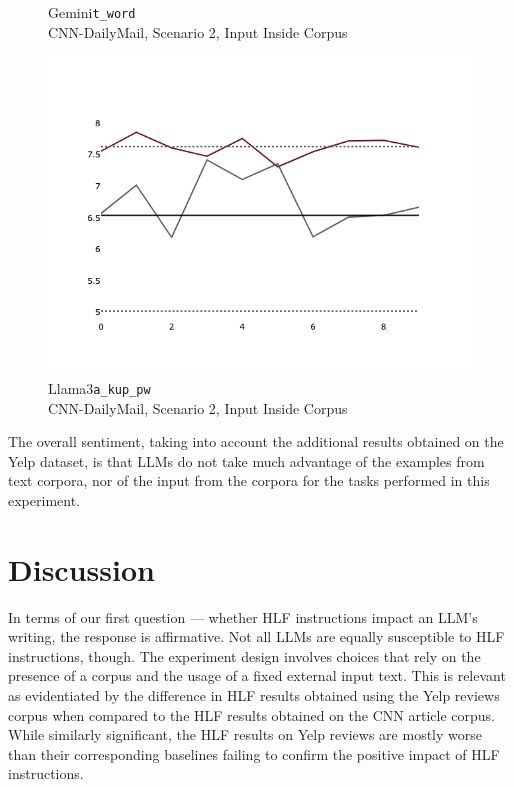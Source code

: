 \documentclass[a4paper,twoside]{article}
\begin{document}
\begin{figure}[ht!]
\begin{minipage}{0.32\textwidth}
        \caption{Gemini\texttt{t\_word}\\CNN-DailyMail, Scenario 2, Input Inside Corpus}\label{fig-p2-ifd-gemini-twords}
    \end{minipage}
    \hfill
    \begin{minipage}{0.32\textwidth}
        \includegraphics[width=\linewidth]{plots/prompt_2_ifd/prompt_2-llama3_70b-cnn_dailymail/prompt_2-llama3_70b-cnn_dailymail_a_kup_pw.png}
        \caption[center]{Llama3\texttt{a\_kup\_pw}\\CNN-DailyMail, Scenario 2, Input Inside Corpus}\label{fig-p2-ifd-llama3-a-kup-pw}
    \end{minipage}
\end{figure}

The overall sentiment, taking into account the additional results obtained on
the Yelp dataset, is that LLMs do not take much advantage of the examples
from text corpora, nor of the input from the corpora for the tasks performed in
this experiment.

\section{Discussion}

In terms of our first question --- whether HLF instructions impact an LLM's
writing, the response is affirmative.
Not all LLMs are equally susceptible to HLF instructions, though.
The experiment design involves choices that rely on the presence of a corpus and
the usage of a fixed external input text.
This is relevant as evidentiated by the difference in HLF results obtained using
the Yelp reviews corpus when compared to the HLF results obtained on the CNN
article corpus.
While similarly significant, the HLF results on Yelp reviews are mostly worse
than their corresponding baselines failing to confirm the positive impact of HLF
instructions.
\end{document}
